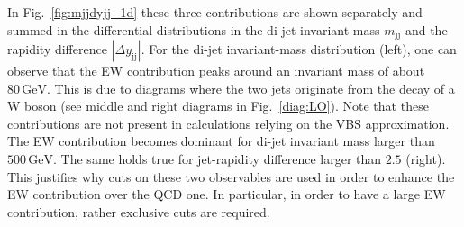 \documentclass[twocolumn,epjc3]{svjour3} %
\newcommand{\Pj}{\ensuremath{\text{j}}\xspace}
\newcommand{\GeV}{\ensuremath{\,\text{GeV}}\xspace}
\begin{document}
    In Fig.~\ref{fig:mjjdyjj_1d} these three contributions are shown separately and summed in the differential distributions in the di-jet invariant mass $m_{\Pj\Pj}$ and the rapidity difference $|\Delta y_{\Pj\Pj}|$.
    For the di-jet invariant-mass distribution (left), one can observe that the EW contribution peaks around an invariant mass of about $80\GeV$.
    This is due to diagrams where the two jets originate from the decay of a W boson (see middle and right diagrams in Fig.~\ref{diag:LO}).
    Note that these contributions are not present in calculations relying on the VBS approximation.
    The EW contribution becomes dominant for di-jet invariant mass larger than $500\GeV$.
    The same holds true for jet-rapidity difference larger than $2.5$ (right).
    This justifies why cuts on these two observables are used in order to enhance the EW contribution over the QCD one.
    In particular, in order to have a large EW contribution, rather exclusive cuts are required.
\end{document}
